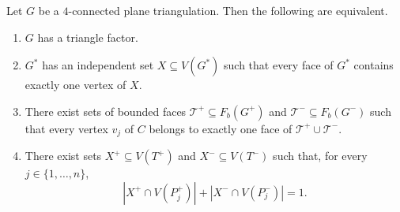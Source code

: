 \documentclass[10pt,a4paper]{amsart}
\begin{document}
\begin{thm}\label{thm:4-conn}
Let $G$ be a $4$-connected plane triangulation.
Then the following are equivalent.

\begin{enumerate}
\item $G$ has a triangle factor.

\item $G^*$ has an independent set
$X\subseteq V(G^*)$ such that every face of $G^*$ contains exactly one vertex
of $X$.

\item There exist sets of bounded faces
$\mathcal T^+\subseteq F_b(G^+)$ and $\mathcal T^-\subseteq F_b(G^-)$ such that
every vertex $v_j$ of $C$ belongs to exactly one face of
$\mathcal T^+\cup\mathcal T^-$.

\item There exist sets $X^+\subseteq V(T^+)$ and $X^-\subseteq V(T^-)$ such
that, for every $j\in\{1,\dots,n\}$,
\[
|X^+\cap V(P_j^+)|+|X^-\cap V(P_j^-)|=1.
\]
\end{enumerate}
\end{thm}
\end{document}
